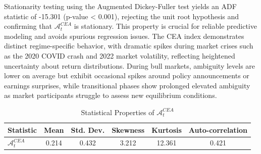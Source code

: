 \documentclass[preprint,12pt,authoryear]{elsarticle}
\begin{document}
Stationarity testing using the Augmented Dickey-Fuller test yields an ADF statistic of -15.301 (p-value < 0.001), rejecting the unit root hypothesis and confirming that $\mathcal{A}^{CEA}_t$ is stationary. This property is crucial for reliable predictive modeling and avoids spurious regression issues. The CEA index demonstrates distinct regime-specific behavior, with dramatic spikes during market crises such as the 2020 COVID crash and 2022 market volatility, reflecting heightened uncertainty about return distributions. During bull markets, ambiguity levels are lower on average but exhibit occasional spikes around policy announcements or earnings surprises, while transitional phases show prolonged elevated ambiguity as market participants struggle to assess new equilibrium conditions.

\begin{table}[h]
\centering
\caption{Statistical Properties of $\mathcal{A}^{CEA}_t$}
\begin{tabular}{lccccc}
\toprule
Statistic & Mean & Std. Dev. & Skewness & Kurtosis & Auto-correlation \\
\midrule
$\mathcal{A}^{CEA}_t$ & 0.214 & 0.432 & 3.212 & 12.361 & 0.421 \\
\bottomrule
\end{tabular}
\end{table}


\end{document}
